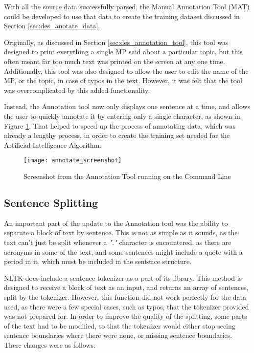 With all the source data successfully parsed, the Manual Annotation Tool (MAT) could be developed to use that data to create the training dataset discussed in Section \ref{sec:des_anotate_data}.

Originally, as discussed in Section \ref{sec:des_annotation_tool}, this tool was designed to print everything a single MP said about a particular topic, but this often meant far too much text was printed on the screen at any one time. Additionally, this tool was also designed to allow the user to edit the name of the MP, or the topic, in case of typos in the text. However, it was felt that the tool was overcomplicated by this added functionality.

Instead, the Annotation tool now only displays one sentence at a time, and allows the user to quickly annotate it by entering only a single character, as shown in Figure \ref{fig:annotate_screenshot}. That helped to speed up the process of annotating data, which was already a lengthy process, in order to create the training set needed for the Artificial Intelligence Algorithm.

\begin{figure}[ht]
\texttt{[image: annotate\_screenshot]}
\caption{Screenshot from the Annotation Tool running on the Command Line}
\label{fig:annotate_screenshot}
\end{figure}

\subsection{Sentence Splitting}
\label{sec:imp_sentence_split}
An important part of the update to the Annotation tool was the ability to separate a block of text by sentence. This is not as simple as it sounds, as the text can't just be split whenever a \emph{"."} character is encountered, as there are acronyms in some of the text, and some sentences might include a quote with a period in it, which must be included in the sentence structure.

NLTK does include a sentence tokenizer as a part of its library. This method is designed to receive a block of text as an input, and returns an array of sentences, split by the tokenizer. However, this function did not work perfectly for the data used, as there were a few special cases, such as typos, that the tokenizer provided was not prepared for. In order to improve the quality of the splitting, some parts of the text had to be modified, so that the tokenizer would either stop seeing sentence boundaries where there were none, or missing sentence boundaries. These changes were as follows:


